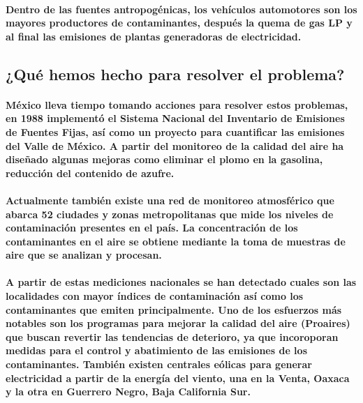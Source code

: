     \paragraph {Dentro de las fuentes antropogénicas, los vehículos automotores son los mayores productores de contaminantes, después la quema de gas LP y al final las emisiones de plantas generadoras de  electricidad.}

  \subsection {¿Qué hemos hecho para resolver el problema?}
    \paragraph {México lleva tiempo tomando acciones para resolver estos problemas, en 1988 implementó el Sistema Nacional del Inventario de Emisiones de Fuentes Fijas, así como un proyecto para cuantificar las emisiones del Valle de México. A partir del monitoreo de la calidad del aire ha diseñado algunas mejoras como eliminar el plomo en la gasolina, reducción del contenido de azufre.}

    \paragraph {Actualmente también existe una red de monitoreo atmosférico que abarca 52 ciudades y zonas metropolitanas que mide los niveles de contaminación presentes en el país. La concentración de los contaminantes en el aire se obtiene mediante la toma de muestras de aire que se analizan y procesan.}

    \paragraph {A partir de estas mediciones nacionales se han detectado cuales son las localidades con mayor índices de contaminación así como los contaminantes que emiten principalmente.  Uno de los esfuerzos más notables son los programas para mejorar la calidad del aire (Proaires) que buscan revertir las tendencias de deterioro, ya que incoroporan medidas para el control y abatimiento de las emisiones de los contaminantes.  También existen centrales eólicas para generar electricidad a partir de la energía del viento, una en la Venta, Oaxaca y la otra en Guerrero Negro, Baja California Sur.}